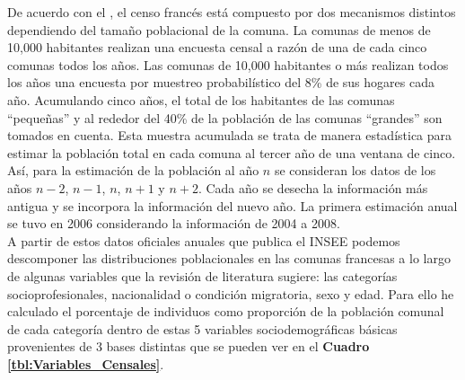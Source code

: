 De acuerdo con el \textcite{FichaCenso}, el censo francés está compuesto por dos mecanismos distintos dependiendo del tamaño poblacional de la comuna. La comunas de menos de 10,000 habitantes realizan una encuesta censal a razón de una de cada cinco comunas todos los años. Las comunas de 10,000 habitantes o más realizan todos los años una encuesta por muestreo probabilístico del 8\% de sus hogares cada año. Acumulando cinco años, el total de los habitantes de las comunas ``pequeñas'' y al rededor del 40\% de la población de las comunas ``grandes'' son tomados en cuenta. Esta muestra acumulada se trata de manera estadística para estimar la población total en cada comuna al tercer año de una ventana de cinco. Así, para la estimación de la población al año $n$ se consideran los datos de los años $n-2$, $n-1$, $n$, $n+1$ y $n+2$. Cada año se desecha la información más antigua y se incorpora la información del nuevo año.  La primera estimación anual se tuvo en 2006 considerando la información de 2004 a 2008.\\

A partir de estos datos oficiales anuales que publica el INSEE podemos descomponer las distribuciones poblacionales en las comunas francesas a lo largo de algunas variables que la revisión de literatura sugiere: las categorías socioprofesionales, nacionalidad o condición migratoria, sexo y edad. Para ello he calculado el porcentaje de individuos como proporción de la población comunal de cada categoría dentro de estas 5 variables sociodemográficas básicas provenientes de 3 bases distintas que se pueden ver en el \textbf{Cuadro \ref{tbl:Variables_Censales}}.\\ 

